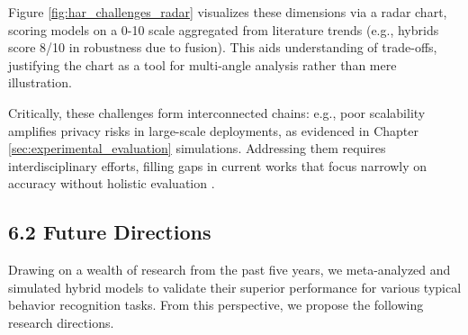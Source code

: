 \documentclass[Afour,sageh,times]{sagej}
\begin{document}
Figure \ref{fig:har_challenges_radar} visualizes these dimensions via a radar chart, scoring models on a 0-10 scale aggregated from literature trends (e.g., hybrids score 8/10 in robustness due to fusion). This aids understanding of trade-offs, justifying the chart as a tool for multi-angle analysis rather than mere illustration.

Critically, these challenges form interconnected chains: e.g., poor scalability amplifies privacy risks in large-scale deployments, as evidenced in Chapter \ref{sec:experimental_evaluation} simulations. Addressing them requires interdisciplinary efforts, filling gaps in current works that focus narrowly on accuracy without holistic evaluation \citep{shi2022environment}.

\subsection{6.2 Future Directions}
\label{subsec:future_directions}
Drawing on a wealth of research from the past five years, we meta-analyzed and simulated hybrid models to validate their superior performance for various typical behavior recognition tasks. From this perspective, we propose the following research directions.
\end{document}
